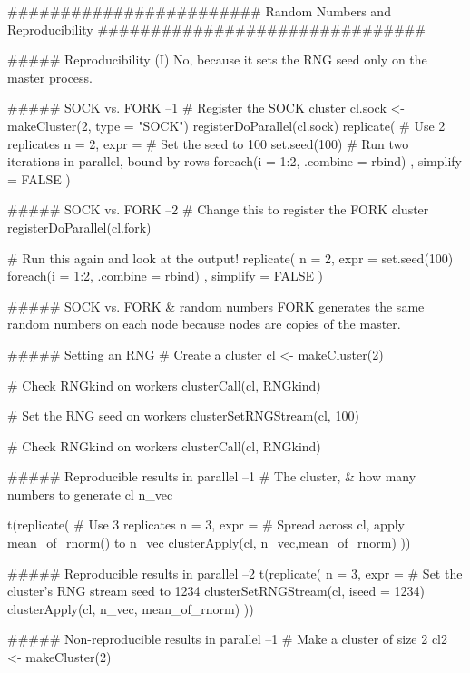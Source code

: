 ########################    Random Numbers and Reproducibility   ###############################


##### Reproducibility (I)
No, because it sets the RNG seed only on the master process.


##### SOCK vs. FORK  --1
# Register the SOCK cluster
cl.sock <- makeCluster(2, type = "SOCK")
registerDoParallel(cl.sock)
replicate(
  # Use 2 replicates
  n = 2, 
  expr = {
    # Set the seed to 100
    set.seed(100)
    # Run two iterations in parallel, bound by rows
    foreach(i = 1:2, .combine = rbind) %
  }, 
  simplify = FALSE
)



##### SOCK vs. FORK  --2
# Change this to register the FORK cluster
registerDoParallel(cl.fork)

# Run this again and look at the output!
replicate(
  n = 2, 
  expr = {
    set.seed(100)
    foreach(i = 1:2, .combine = rbind) %
  }, 
  simplify = FALSE
)



##### SOCK vs. FORK & random numbers
FORK generates the same random numbers on each node because nodes are copies of the master.


##### Setting an RNG
# Create a cluster
cl <- makeCluster(2)

# Check RNGkind on workers
clusterCall(cl, RNGkind)

# Set the RNG seed on workers
clusterSetRNGStream(cl, 100)

# Check RNGkind on workers
clusterCall(cl, RNGkind)





##### Reproducible results in parallel  --1
# The cluster, & how many numbers to generate
cl
n_vec

t(replicate(
  # Use 3 replicates
  n = 3,
  expr = {
    # Spread across cl, apply mean_of_rnorm() to n_vec
    clusterApply(cl, n_vec,mean_of_rnorm)
  }
))





##### Reproducible results in parallel  --2
t(replicate(
  n = 3,
  expr = {
    # Set the cluster's RNG stream seed to 1234
    clusterSetRNGStream(cl, iseed = 1234)
    clusterApply(cl, n_vec, mean_of_rnorm)
  }
))





##### Non-reproducible results in parallel --1
# Make a cluster of size 2
cl2 <- makeCluster(2)

